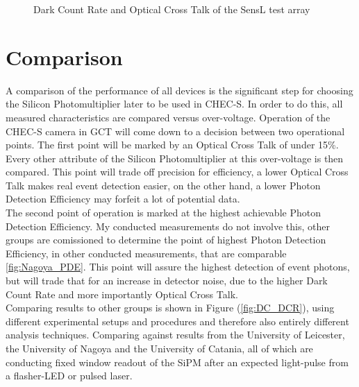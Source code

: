 \documentclass[12pt,article,type=msc,colorback,accentcolor=tud9c]{tudthesis}
\begin{document}
\begin{figure}[h]
\begin{centering}
\caption{Dark Count Rate and Optical Cross Talk of the SensL test array}
\label{fig:SensLDCROCT}
\end{centering}
\end{figure}







\newpage
\section{Comparison}
\label{sec:comparison}
A comparison of the performance of all devices is the significant step for choosing the Silicon Photomultiplier later to be used in CHEC-S. In order to do this, all measured characteristics are compared versus over-voltage. Operation of the CHEC-S camera in GCT will come down to a decision between two operational points. The first point will be marked by an Optical Cross Talk of under 15\%. Every other attribute of the Silicon Photomultiplier at this over-voltage is then compared. This point will trade off precision for efficiency, a lower Optical Cross Talk makes real event detection easier, on the other hand, a lower Photon Detection Efficiency may forfeit a lot of potential data.\\
The second point of operation is marked at the highest achievable Photon Detection Efficiency. My conducted measurements do not involve this, other groups are comissioned to determine the point of highest Photon Detection Efficiency, in other conducted measurements, that are comparable \ref{fig:Nagoya_PDE}. This point will assure the highest detection of event photons, but will trade that for an increase in detector noise, due to the higher Dark Count Rate and more importantly Optical Cross Talk.\\
Comparing results to other groups is shown in Figure (\ref{fig:DC_DCR}), using different experimental setups and procedures and therefore also entirely different analysis techniques. Comparing against results from the University of Leicester, the University of Nagoya and the University of Catania, all of which are conducting fixed window readout of the SiPM after an expected light-pulse from a flasher-LED or pulsed laser. 
\end{document}
